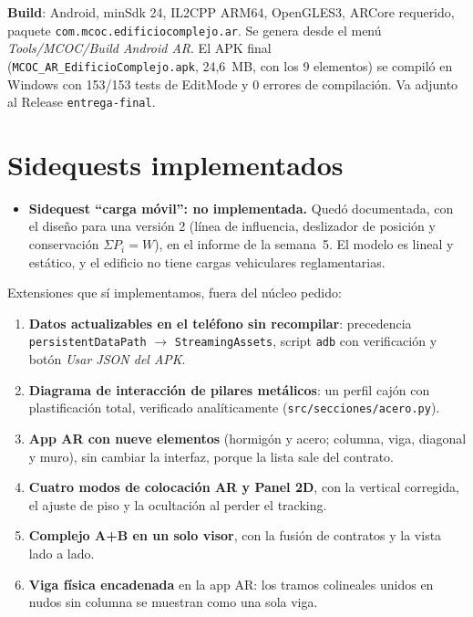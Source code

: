 \documentclass[11pt,a4paper]{article}
\begin{document}
\textbf{Build}: Android, minSdk 24, IL2CPP ARM64, OpenGLES3, ARCore requerido,
paquete \texttt{com.mcoc.edificiocomplejo.ar}. Se genera desde el menú
\emph{Tools/MCOC/Build Android AR}. El APK final
(\texttt{MCOC\_AR\_EdificioComplejo.apk}, 24,6~MB, con los 9 elementos) se
compiló en Windows con 153/153 tests de EditMode y 0 errores de compilación. Va
adjunto al Release \texttt{entrega-final}.

\section{Sidequests implementados}

\begin{itemize}
  \item \textbf{Sidequest ``carga móvil'': no implementada.} Quedó documentada,
        con el diseño para una versión 2 (línea de influencia, deslizador de
        posición y conservación $\Sigma P_i = W$), en el informe de la
        semana~5. El modelo es lineal y estático, y el edificio no tiene cargas
        vehiculares reglamentarias.
\end{itemize}

Extensiones que sí implementamos, fuera del núcleo pedido:
\begin{enumerate}
  \item \textbf{Datos actualizables en el teléfono sin recompilar}: precedencia
        \texttt{persistentDataPath} $\to$ \texttt{StreamingAssets}, script
        \texttt{adb} con verificación y botón \emph{Usar JSON del APK}.
  \item \textbf{Diagrama de interacción de pilares metálicos}: un perfil cajón
        con plastificación total, verificado analíticamente
        (\texttt{src/secciones/acero.py}).
  \item \textbf{App AR con nueve elementos} (hormigón y acero; columna, viga,
        diagonal y muro), sin cambiar la interfaz, porque la lista sale del
        contrato.
  \item \textbf{Cuatro modos de colocación AR y Panel 2D}, con la vertical
        corregida, el ajuste de piso y la ocultación al perder el tracking.
  \item \textbf{Complejo A+B en un solo visor}, con la fusión de contratos y la
        vista lado a lado.
  \item \textbf{Viga física encadenada} en la app AR: los tramos colineales
        unidos en nudos sin columna se muestran como una sola viga.
\end{enumerate}
\end{document}
